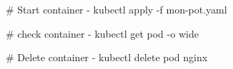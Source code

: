 # Start container
- kubectl apply -f mon-pot.yaml

# check container
- kubectl get pod -o wide

# Delete container
- kubectl delete pod nginx